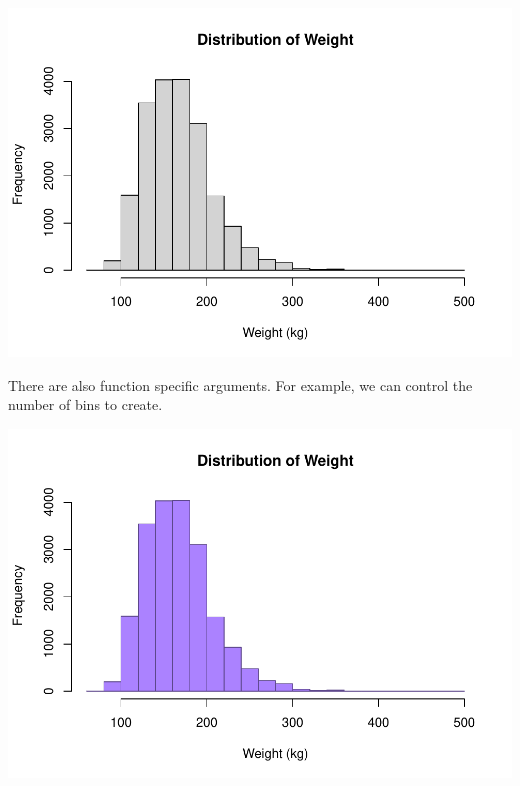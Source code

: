\documentclass[
]{book}
\newenvironment{Shaded}{\begin{snugshade}}{\end{snugshade}}
\newcommand{\DataTypeTok}[1]{\textcolor[rgb]{0.13,0.29,0.53}{#1}}
\newcommand{\DecValTok}[1]{\textcolor[rgb]{0.00,0.00,0.81}{#1}}
\newcommand{\KeywordTok}[1]{\textcolor[rgb]{0.13,0.29,0.53}{\textbf{#1}}}
\newcommand{\NormalTok}[1]{#1}
\newcommand{\OperatorTok}[1]{\textcolor[rgb]{0.81,0.36,0.00}{\textbf{#1}}}
\newcommand{\StringTok}[1]{\textcolor[rgb]{0.31,0.60,0.02}{#1}}
\begin{document}
\begin{Shaded}
\end{Shaded}

\includegraphics{_main_files/figure-latex/unnamed-chunk-128-1.pdf}

There are also function specific arguments. For example, we can control the number of bins to create.

\begin{Shaded}
\end{Shaded}

\includegraphics{_main_files/figure-latex/unnamed-chunk-129-1.pdf}
\end{document}
